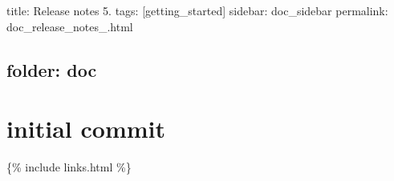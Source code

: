 

 title\+: Release notes 5. tags\+: \mbox{[}getting\+\_\+started\mbox{]} sidebar\+: doc\+\_\+sidebar permalink\+: doc\+\_\+release\+\_\+notes\+\_.\+html \subsection*{folder\+: doc }

\section*{initial commit}

\{\% include links.\+html \%\} 